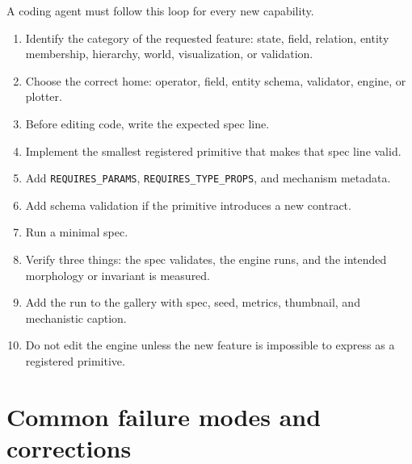 \documentclass[11pt]{article}
\newcommand{\code}[1]{\texttt{#1}}
\begin{document}
A coding agent must follow this loop for every new capability.
\begin{enumerate}\itemsep2pt
\item Identify the category of the requested feature: state, field, relation, entity
membership, hierarchy, world, visualization, or validation.
\item Choose the correct home: operator, field, entity schema, validator, engine, or
plotter.
\item Before editing code, write the expected spec line.
\item Implement the smallest registered primitive that makes that spec line valid.
\item Add \code{REQUIRES\_PARAMS}, \code{REQUIRES\_TYPE\_PROPS}, and mechanism metadata.
\item Add schema validation if the primitive introduces a new contract.
\item Run a minimal spec.
\item Verify three things: the spec validates, the engine runs, and the intended
morphology or invariant is measured.
\item Add the run to the gallery with spec, seed, metrics, thumbnail, and mechanistic
caption.
\item Do not edit the engine unless the new feature is impossible to express as a
registered primitive.
\end{enumerate}

\section{Common failure modes and corrections}
\end{document}
